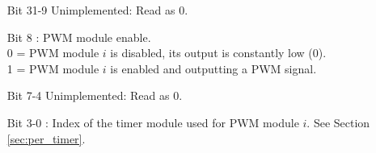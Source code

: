 \vspace{-2mm}
\begin{itemize}[leftmargin=18mm,labelsep=3mm,parsep=1.5mm]
    \item[\footnotesize Bit 31-9] Unimplemented: Read as 0.
    \item[\footnotesize Bit 8] : PWM module enable.\\{\footnotesize
    0 = PWM module $i$ is disabled, its output is constantly low (0).\\
    1 = PWM module $i$ is enabled and outputting a PWM signal.}
    \item[\footnotesize Bit 7-4] Unimplemented: Read as 0.
    \item[\footnotesize Bit 3-0] : Index of the timer module used for PWM module $i$. See Section \ref{sec:per_timer}.
\end{itemize}

